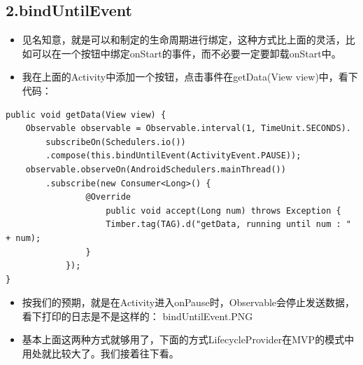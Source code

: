 \documentclass[9pt, b5paper]{article}
\begin{document}
\subsection{2.bindUntilEvent}
\label{sec-20-3}
\begin{itemize}
\item 见名知意，就是可以和制定的生命周期进行绑定，这种方式比上面的灵活，比如可以在一个按钮中绑定onStart的事件，而不必要一定要卸载onStart中。
\item 我在上面的Activity中添加一个按钮，点击事件在getData(View view)中，看下代码：
\end{itemize}
\begin{verbatim}
public void getData(View view) {
    Observable observable = Observable.interval(1, TimeUnit.SECONDS).
        subscribeOn(Schedulers.io())
        .compose(this.bindUntilEvent(ActivityEvent.PAUSE));
    observable.observeOn(AndroidSchedulers.mainThread())
        .subscribe(new Consumer<Long>() {
                @Override
                    public void accept(Long num) throws Exception {
                    Timber.tag(TAG).d("getData, running until num : " + num);
                }
            });
}
\end{verbatim}
\begin{itemize}
\item 按我们的预期，就是在Activity进入onPause时，Observable会停止发送数据，看下打印的日志是不是这样的：   bindUntilEvent.PNG
\item 基本上面这两种方式就够用了，下面的方式LifecycleProvider在MVP的模式中用处就比较大了。我们接着往下看。
\end{itemize}
\end{document}
